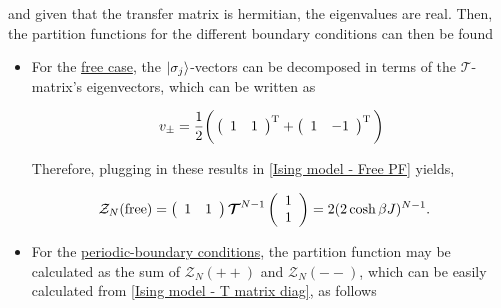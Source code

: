 \documentclass{homework}
\begin{document}
and given that the transfer matrix is hermitian, the eigenvalues are real. Then, the partition functions for the different boundary conditions can then be found

\begin{itemize}
    \item For the \underline{free case}, the $\ket{\sigma_j}$-vectors can be decomposed in terms of the $\bm{\mathcal{T}}$-matrix's eigenvectors, which can be written as 
    
    $$ 
     v_{\pm}= \frac{1}{2} \bigg(\left(\begin{array}{cc}
     1 & 1 \end{array}\right)^{\textnormal{T}} + \left(\begin{array}{cc}
     1 & -1 \end{array}\right)^{\textnormal{T}} \bigg) 
     $$
     
     Therefore, plugging in these results in \cref{Ising model - Free PF} yields,
     
     \begin{equation}
         \begin{split}
             \mathcal{Z}_N(\textnormal{free}) &= \left(\begin{array}{cc}
        1 & 1 \\
    \end{array}\right) \bm{\mathcal{T}}^{N-1} \left(\begin{array}{c}
        1 \\
        1 
    \end{array}\right) = 2(2\cosh \beta J)^{N-1}.
         \end{split}
     \end{equation}
     
    \item For the \underline{periodic-boundary conditions}, the partition function may be calculated as the sum of $\mathcal{Z}_N(++)$ and $\mathcal{Z}_N(--)$, which can be easily calculated from \cref{Ising model - T matrix diag}, as follows 
    

\end{itemize}
\end{document}
